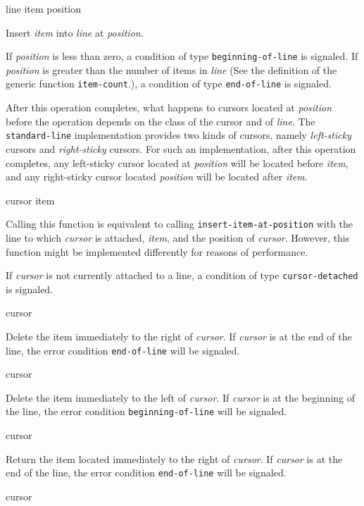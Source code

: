  {line item position}

Insert \textit{item} into \textit{line} at \textit{position}.

If \textit{position} is less than zero, a condition of type
\texttt{beginning-of-line} is signaled.  If \textit{position} is
greater than the number of items in \textit{line} (See the definition
of the generic function \texttt{item-count}.), a condition of type
\texttt{end-of-line} is signaled.

After this operation completes, what happens to cursors located at
\textit{position} before the operation depends on the class of the
cursor and of \textit{line}.  The \texttt{standard-line}
implementation provides two kinds of cursors, namely
\emph{left-sticky} cursors and \emph{right-sticky} cursors.  For such
an implementation, after this operation completes, any left-sticky
cursor located at \textit{position} will be located before
\textit{item}, and any right-sticky cursor located \textit{position}
will be located after \textit{item}.

 {cursor item}

Calling this function is equivalent to calling
\texttt{insert-item-at-position} with the line to which
\textit{cursor} is attached, \textit{item}, and the position of
\textit{cursor}.  However, this function might be implemented
differently for reasons of performance.

If \textit{cursor} is not currently attached to a line, a condition
of type \texttt{cursor-detached} is signaled.

 {cursor}

Delete the item immediately to the right of \emph{cursor}.  If
\emph{cursor} is at the end of the line, the error condition
\texttt{end-of-line} will be signaled.

 {cursor}

Delete the item immediately to the left of \emph{cursor}.  If
\emph{cursor} is at the beginning of the line, the error condition
\texttt{beginning-of-line} will be signaled.

 {cursor}

Return the item located immediately to the right of \textit{cursor}.
If \emph{cursor} is at the end of the line, the error condition
\texttt{end-of-line} will be signaled.

 {cursor}

